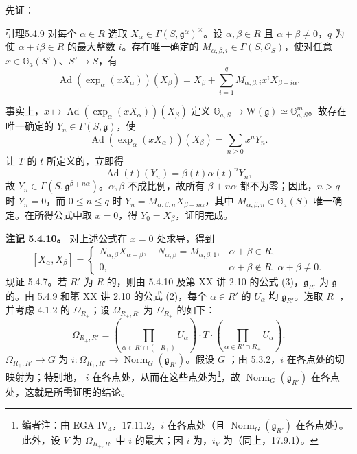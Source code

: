 先证：
\begin{SGAresult}{引理}{5.4.9} 对每个 $\alpha\in R$ 选取 $X_\alpha\in\Gamma(S,\mathfrak g^\alpha)^\times$。设 $\alpha,\beta\in R$ 且 $\alpha+\beta\ne0$，$q$ 为使 $\alpha+i\beta\in R$ 的最大整数 $i$。存在唯一确定的 $M_{\alpha,\beta,i}\in\Gamma(S,\mathcal O_S)$，使对任意 $x\in\mathbb G_a(S')$、$S'\to S$，有
\[\operatorname{Ad}(\exp_\alpha(xX_\alpha))(X_\beta)=X_\beta+\sum_{i=1}^q M_{\alpha,\beta,i}x^iX_{\beta+i\alpha}.\]
\end{SGAresult}
事实上，$x\mapsto\operatorname{Ad}(\exp_\alpha(xX_\alpha))(X_\beta)$ 定义 $\mathbb G_{a,S}\to\mathrm W(\mathfrak g)\simeq\mathbb G_{a,S}^m$。故存在唯一确定的 $Y_n\in\Gamma(S,\mathfrak g)$，使
\[\operatorname{Ad}(\exp_\alpha(xX_\alpha))(X_\beta)=\sum_{n\geq0}x^nY_n.\]
让 $T$ 的 $t$ 所定义的，立即得
\[\operatorname{Ad}(t)(Y_n)=\beta(t)\alpha(t)^nY_n,\]
故 $Y_n\in\Gamma(S,\mathfrak g^{\beta+n\alpha})$。$\alpha,\beta$ 不成比例，故所有 $\beta+n\alpha$ 都不为零；因此，$n>q$ 时 $Y_n=0$，而
$0\leq n\leq q$ 时 $Y_n=M_{\alpha,\beta,n}X_{\beta+n\alpha}$，其中 $M_{\alpha,\beta,n}\in\mathbb G_a(S)$ 唯一确定。在所得公式中取 $x=0$，得 $Y_0=X_\beta$，证明完成。

\textbf{注记 5.4.10。} 对上述公式在 $x=0$ 处求导，得到
\[[X_\alpha,X_\beta]=\begin{cases}N_{\alpha,\beta}X_{\alpha+\beta},\quad N_{\alpha,\beta}=M_{\alpha,\beta,1},&\alpha+\beta\in R,\\0,&\alpha+\beta\notin R,\ \alpha+\beta\ne0.\end{cases}\]
现证 5.4.7。若 $R'$ 为 $R$ 的，则由 5.4.10 及第 XX 讲 2.10 的公式 (3)，$\mathfrak g_{R'}$ 为 $\mathfrak g$ 的。由 5.4.9 和第 XX 讲 2.10 的公式 (2)，每个 $\alpha\in R'$ 的 $U_\alpha$ 均 $\mathfrak g_{R'}$。选取 $R_+$，并考虑 4.1.2 的 $\Omega_{R_+}$；设 $\Omega_{R_+,R'}$ 为 $\Omega_{R_+}$ 的如下：
\[\Omega_{R_+,R'}=\left(\prod_{\alpha\in R'\cap(-R_+)}U_\alpha\right)\cdot T\cdot\left(\prod_{\alpha\in R'\cap R_+}U_\alpha\right).\]
 $\Omega_{R_+,R'}\to G$ 为 $i:\Omega_{R_+,R'}\to\operatorname{Norm}_G(\mathfrak g_{R'})$。假设 $G$ ；由 5.3.2，$i$ 在各点处的切映射为；特别地， $i$ 在各点处，从而在这些点处为\footnote{编者注：由 EGA IV$_4$，17.11.2，$i$ 在各点处（且 $\operatorname{Norm}_G(\mathfrak g_{R'})$ 在各点处）。此外，设 $V$ 为 $\Omega_{R_+,R'}$ 中 $i$ 的最大；因 $i$ 为，$i_V$ 为（同上，17.9.1）。}，故 $\operatorname{Norm}_G(\mathfrak g_{R'})$ 在各点处，这就是所需证明的结论。
